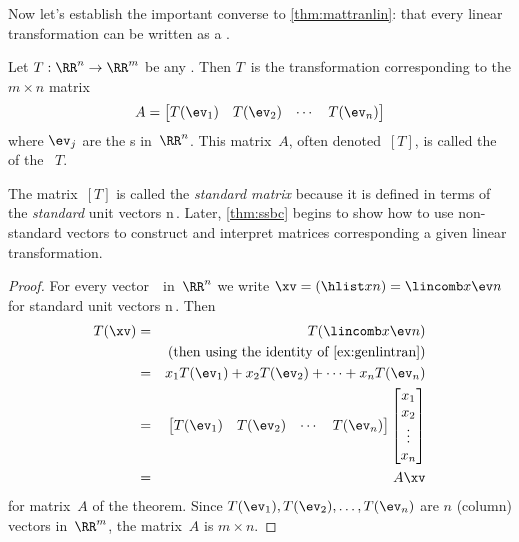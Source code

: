 Now let's establish the important converse to \cref{thm:mattranlin}: that every linear transformation can be written as a .

\begin{theorem} \label{thm:matlintran} 
Let \(T:\RR^n\to\RR^m\) be any .
Then \(T\)~is the transformation corresponding to the \(m\times n\)  matrix
\begin{equation*}
A=\begin{bmatrix} T(\ev_1)& T(\ev_2)&\cdots&T(\ev_n) \end{bmatrix}
\end{equation*}
where \(\ev_j\) are the s in~\(\RR^n\).
This matrix~\(A\), often denoted~\([T]\), is called the  of the ~\(T\).
\end{theorem}

The matrix~\([T]\) is called the \emph{standard matrix} because it is defined in terms of the \emph{standard} unit vectors \hlist\ev n\,.
Later, \cref{thm:ssbc} begins to show how to use non-standard vectors to construct and interpret matrices corresponding a given linear transformation.

\begin{proof} 
For every vector~\xv\ in~\(\RR^n\) we write \(\xv=(\hlist xn)=\lincomb x\ev n\) for standard unit vectors \hlist\ev n\,.
Then
\begin{eqnarray*}
T(\xv)&=&T(\lincomb x\ev n)
\\&&(\text{then using the identity of \cref{ex:genlintran}})
\\&=&x_1T(\ev_1)+x_2T(\ev_2)+\cdots+x_nT(\ev_n)
\\&=&\begin{bmatrix} T(\ev_1)& T(\ev_2)&\cdots&T(\ev_n) \end{bmatrix}
\begin{bmatrix} x_1\\x_2\\\vdots\\x_n \end{bmatrix}
\\&=&A\xv
\end{eqnarray*}
for matrix~\(A\) of the theorem.
Since \(T(\ev_1), T(\ev_2),\ldots,T(\ev_n)\) are \(n\) (column) vectors in~\(\RR^m\), the matrix~\(A\) is \(m\times n\).
\end{proof}


